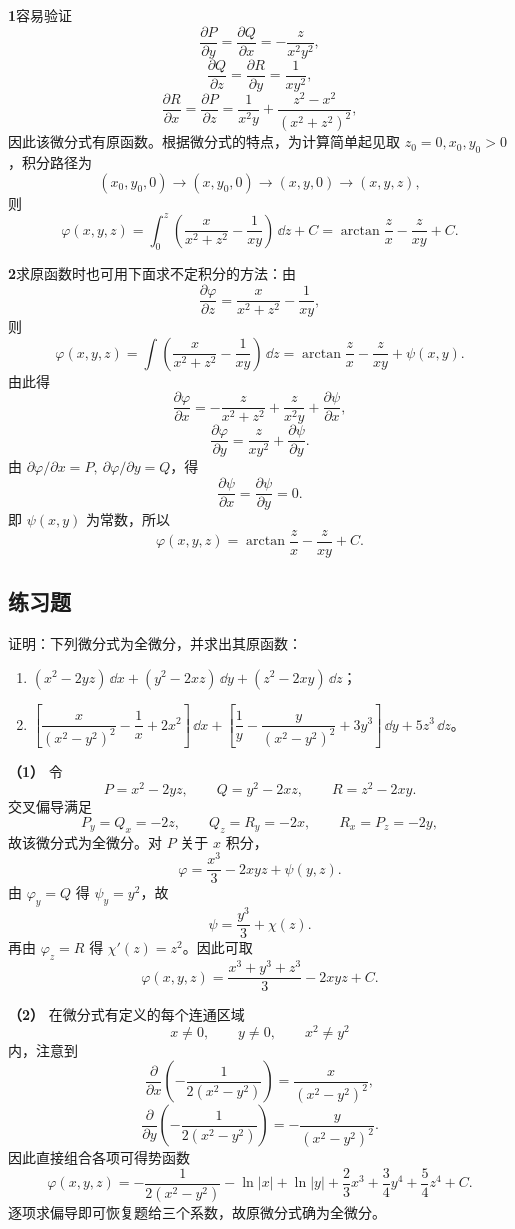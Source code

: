 \begin{xsolution}
\textbf{1}\quad 容易验证
\[
  \frac{\partial P}{\partial y}=\frac{\partial Q}{\partial x}=-\frac z{x^2y^2},
\]
\[
  \frac{\partial Q}{\partial z}=\frac{\partial R}{\partial y}=\frac1{xy^2},
\]
\[
  \frac{\partial R}{\partial x}=\frac{\partial P}{\partial z}=\frac1{x^2y}+\frac{z^2-x^2}{(x^2+z^2)^2},
\]
因此该微分式有原函数。根据微分式的特点，为计算简单起见取 $z_0=0,x_0,y_0>0$，积分路径为
\[
  (x_0,y_0,0)\longrightarrow(x,y_0,0)\longrightarrow(x,y,0)\longrightarrow(x,y,z),
\]
则
\[
  \varphi(x,y,z)=\int_0^z\left(\frac x{x^2+z^2}-\frac1{xy}\right)\,\dd z+C
  =\arctan\frac zx-\frac z{xy}+C.
\]

\textbf{2}\quad 求原函数时也可用下面求不定积分的方法：由
\[
  \frac{\partial\varphi}{\partial z}=\frac x{x^2+z^2}-\frac1{xy},
\]
则
\[
  \varphi(x,y,z)=\int\left(\frac x{x^2+z^2}-\frac1{xy}\right)\,\dd z
  =\arctan\frac zx-\frac z{xy}+\psi(x,y).
\]
由此得
\[
  \frac{\partial\varphi}{\partial x}=-\frac z{x^2+z^2}+\frac z{x^2y}+\frac{\partial\psi}{\partial x},
\]
\[
  \frac{\partial\varphi}{\partial y}=\frac z{xy^2}+\frac{\partial\psi}{\partial y}.
\]
由 $\partial\varphi/\partial x=P,\ \partial\varphi/\partial y=Q$，得
\[
  \frac{\partial\psi}{\partial x}=\frac{\partial\psi}{\partial y}=0.
\]
即 $\psi(x,y)$ 为常数，所以
\[
  \varphi(x,y,z)=\arctan\frac zx-\frac z{xy}+C.
\]
\end{xsolution}

\subsection{练习题}

\begin{xexercise}[1]
证明：下列微分式为全微分，并求出其原函数：
\begin{enumerate}[label=(\arabic*)]
\item $(x^2-2yz)\,\dd x+(y^2-2xz)\,\dd y+(z^2-2xy)\,\dd z$；
\item $\left[\dfrac{x}{(x^2-y^2)^2}-\dfrac1x+2x^2\right]\,\dd x+
\left[\dfrac1y-\dfrac{y}{(x^2-y^2)^2}+3y^3\right]\,\dd y+5z^3\,\dd z$。
\end{enumerate}
\end{xexercise}
\begin{xsolution}
\textbf{（1）}\quad
令
\[
  P=x^2-2yz,\qquad Q=y^2-2xz,\qquad R=z^2-2xy.
\]
交叉偏导满足
\[
  P_y=Q_x=-2z,\qquad Q_z=R_y=-2x,\qquad R_x=P_z=-2y,
\]
故该微分式为全微分。对 $P$ 关于 $x$ 积分，
\[
  \varphi=\frac{x^3}{3}-2xyz+\psi(y,z).
\]
由 $\varphi_y=Q$ 得 $\psi_y=y^2$，故
\[
  \psi=\frac{y^3}{3}+\chi(z).
\]
再由 $\varphi_z=R$ 得 $\chi'(z)=z^2$。因此可取
\[
  \boxed{\varphi(x,y,z)=\frac{x^3+y^3+z^3}{3}-2xyz+C}.
\]

\textbf{（2）}\quad
在微分式有定义的每个连通区域
\[
  x\ne0,\qquad y\ne0,\qquad x^2\ne y^2
\]
内，注意到
\[
  \frac{\partial}{\partial x}\left(-\frac1{2(x^2-y^2)}\right)
  =\frac{x}{(x^2-y^2)^2},
\]
\[
  \frac{\partial}{\partial y}\left(-\frac1{2(x^2-y^2)}\right)
  =-\frac{y}{(x^2-y^2)^2}.
\]
因此直接组合各项可得势函数
\[
\boxed{
\varphi(x,y,z)
=-\frac1{2(x^2-y^2)}-\ln|x|+\ln|y|
+\frac23x^3+\frac34y^4+\frac54z^4+C}.
\]
逐项求偏导即可恢复题给三个系数，故原微分式确为全微分。
\end{xsolution}


